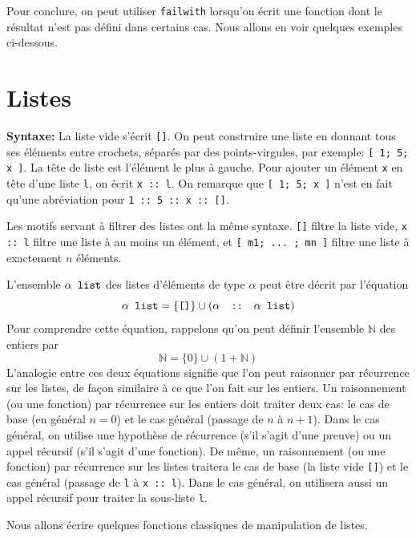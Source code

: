 \documentclass[11pt,a4paper]{article}
\begin{document}
Pour conclure, on peut utiliser {\tt failwith} lorsqu'on écrit une
fonction dont le résultat n'est pas défini dans certains cas. Nous
allons en voir quelques exemples ci-dessous.


\section{Listes}

\textbf{Syntaxe:} La liste vide s'écrit \verb+[]+. On peut construire
une liste en donnant tous ses éléments entre crochets, séparés par des
points-virgules, par exemple: \verb+[ 1; 5; x ]+. La tête de liste est
l'élément le plus à gauche. Pour ajouter un élément {\tt x} en tête
d'une liste {\tt l}, on écrit \verb+x :: l+. On remarque que
\verb+[ 1; 5; x ]+ n'est en fait qu'une abréviation pour
\verb+1 :: 5 :: x :: []+.

Les motifs servant à filtrer des listes ont la même syntaxe. \verb+[]+
filtre la liste vide, \verb+x :: l+ filtre une liste à au moins un
élément, et \verb+[ m1; ... ; mn ]+ filtre une liste à exactement $n$
éléments.

\def\alist{\alpha\text{\tt\ list}} L'ensemble $\alist$ des listes
d'éléments de type $\alpha$ peut être décrit par l'équation
$$\alist = \{ \verb+[]+ \} \cup (\alpha \quad\verb+::+\quad \alist)$$
\def\Nat{\mathbb{N}} Pour comprendre cette équation, rappelons qu'on
peut définir l'ensemble $\Nat$ des entiers par
$$\Nat = \{ 0 \} \cup (1 + \Nat)$$ L'analogie entre ces deux équations
signifie que l'on peut raisonner par récurrence sur les listes, de
façon similaire à ce que l'on fait sur les entiers.  Un raisonnement
(ou une fonction) par récurrence sur les entiers doit traiter deux
cas: le cas de base (en général $n=0$) et le cas général (passage de
$n$ à $n+1$). Dans le cas général, on utilise une hypothèse de
récurrence (s'il s'agit d'une preuve) ou un appel récursif (s'il
s'agit d'une fonction). De même, un raisonnement (ou une fonction) par
récurrence sur les listes traitera le cas de base (la liste vide
\verb+[]+) et le cas général (passage de \verb+l+ à
\verb+x :: l+). Dans le cas général, on utilisera aussi un appel
récursif pour traiter la sous-liste \verb+l+.

Nous allons écrire quelques fonctions classiques de manipulation de listes.
\end{document}

